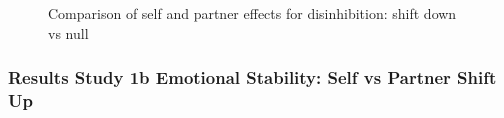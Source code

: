 \documentclass[
  singlecolumn]{article}
\begin{document}
\begin{figure}


\caption{\label{fig-results-disinhibition-self-partner-down-comparison}Comparison
of self and partner effects for disinhibition: shift down vs null}

\end{figure}%

\newpage{}

\subsubsection{Results Study 1b Emotional Stability: Self vs Partner
Shift
Up}\label{results-study-1b-emotional-stability-self-vs-partner-shift-up}
\end{document}
